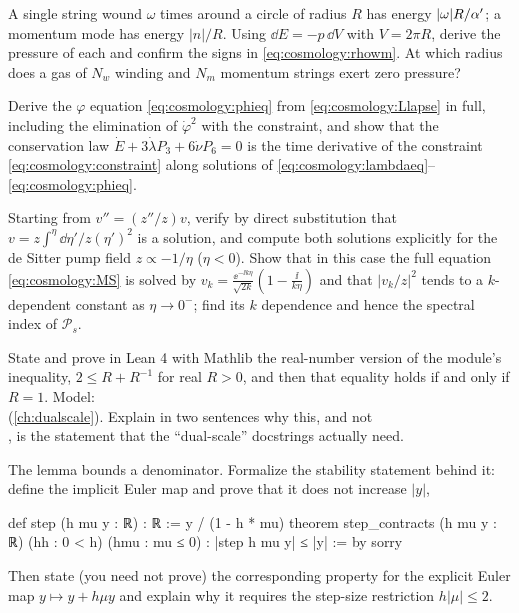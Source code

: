 \begin{exercise}[$\star$]
A single string wound $\omega$ times around a circle of radius $R$ has energy $|\omega|R/\alpha'$;
a momentum mode has energy $|n|/R$. Using $\dd E=-p\,\dd V$ with $V=2\pi R$, derive the
pressure of each and confirm the signs in \eqref{eq:cosmology:rhowm}. At which radius does a
gas of $N_w$ winding and $N_m$ momentum strings exert zero pressure?
\end{exercise}

\begin{exercise}[$\star\star$]
Derive the $\varphi$ equation \eqref{eq:cosmology:phieq} from \eqref{eq:cosmology:Llapse} in
full, including the elimination of $\dot\varphi^2$ with the constraint, and show that the
conservation law $\dot E+3\dot\lambda P_3+6\dot\nu P_6=0$ is the time derivative of the
constraint \eqref{eq:cosmology:constraint} along solutions of
\eqref{eq:cosmology:lambdaeq}--\eqref{eq:cosmology:phieq}.
\end{exercise}

\begin{exercise}[$\star\star$]
Starting from $v''=(z''/z)v$, verify by direct substitution that $v=z\int^\eta\dd\eta'/z(\eta')^2$
is a solution, and compute both solutions explicitly for the de Sitter pump field
$z\propto-1/\eta$ ($\eta<0$). Show that in this case the full equation \eqref{eq:cosmology:MS}
is solved by $v_k=\frac{\ee^{-\ii k\eta}}{\sqrt{2k}}(1-\frac{\ii}{k\eta})$ and that
$|v_k/z|^2$ tends to a $k$-dependent constant as $\eta\to0^-$; find its $k$ dependence and
hence the spectral index of $\mathcal P_s$.
\end{exercise}

\begin{exercise}
State and prove in Lean 4 with Mathlib the real-number version of the module's inequality,
$2\le R+R^{-1}$ for real $R>0$, and then that equality holds if and only if $R=1$. Model:\\
 (\cref{ch:dualscale}). Explain in two sentences
why this, and not\\ , is the statement that
the ``dual-scale'' docstrings actually need.
\end{exercise}

\begin{exercise}
The lemma  bounds a denominator.
Formalize the stability statement behind it: define the implicit Euler map and prove that
it does not increase $|y|$,
\begin{leancode}
def step (h mu y : ℝ) : ℝ := y / (1 - h * mu)
theorem step_contracts (h mu y : ℝ) (hh : 0 < h) (hmu : mu ≤ 0) :
    |step h mu y| ≤ |y| := by sorry
\end{leancode}
Then state (you need not prove) the corresponding property for the explicit Euler map
$y\mapsto y+h\mu y$ and explain why it requires the step-size restriction $h|\mu|\le2$.
\end{exercise}

